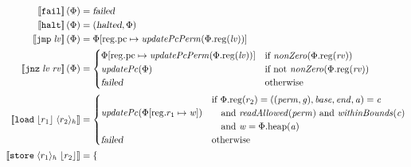 \documentclass{article}
\newcommand{\update}[2]{[#1 \mapsto #2]}
\newcommand{\sem}[1]{\left\llbracket #1 \right\rrbracket}
\newcommand{\var}[1]{\mathit{#1}}
\newcommand{\rv}{\var{rv}}
\newcommand{\lv}{\var{lv}}
\newcommand{\gl}{\var{g}}
\newcommand{\pcreg}{\mathrm{pc}}
\newcommand{\addr}{\var{a}}
\newcommand{\start}{\var{base}}
\newcommand{\addrend}{\var{end}}
\newcommand{\perm}{\var{perm}}
\newcommand{\stdcap}[1][(\perm,\gl)]{\left(#1,\start,\addrend,\addr \right)}
\newcommand{\plainproj}[1]{\mathrm{#1}}
\newcommand{\memheap}[1][\Phi]{#1.\plainproj{heap}}
\newcommand{\memreg}[1][\Phi]{#1.\plainproj{reg}}
\newcommand{\updateReg}[3][\Phi]{#1\update{\plainproj{reg}.#2}{#3}}
\newcommand{\failed}{\textsl{failed}}
\newcommand{\halted}{\textsl{halted}}
\newcommand{\plainfun}[2]{
  \ifthenelse{\equal{#2}{}}
             {\mathit{#1}}
             {\mathit{#1}(#2)}
}
\newcommand{\updatePcPerm}[1]{\plainfun{updatePcPerm}{#1}}
\newcommand{\nonZero}[1]{\plainfun{nonZero}{#1}}
\newcommand{\readAllowed}[1]{\plainfun{readAllowed}{#1}}
\newcommand{\withinBounds}[1]{\plainfun{withinBounds}{#1}}
\newcommand{\stdUpdatePc}[1]{\plainfun{updatePc}{#1}}
\newcommand{\refreg}[1]{\lfloor #1 \rfloor}
\newcommand{\refheap}[1]{\langle #1 \rangle_h}
\newcommand{\zinstr}[1]{\mathtt{#1}}
\newcommand{\fail}{\zinstr{fail}}
\newcommand{\halt}{\zinstr{halt}}
\newcommand{\oneinstr}[2]{\zinstr{#1} \; #2}
\newcommand{\jmp}[1]{\oneinstr{jmp}{#1}}
\newcommand{\twoinstr}[3]{\zinstr{#1} \; #2 \; #3}
\newcommand{\jnz}[2]{\twoinstr{jnz}{#1}{#2}}
\newcommand{\store}[2]{\twoinstr{store}{#1}{#2}}
\newcommand{\load}[2]{\twoinstr{load}{#1}{#2}}
\begin{document}
\begin{align*}
  \sem{\fail}(\Phi)                        & = \failed \\
  \sem{\halt}(\Phi)                        & = (\halted,\Phi) \\
  \sem{\jmp{\lv}}(\Phi)                    & = \updateReg{\pcreg}{\updatePcPerm{\memreg(\lv)}} \\
  \sem{\jnz{\lv}{\rv}}(\Phi)               & = 
                                             \begin{cases}
                                               \updateReg{\pcreg}{\updatePcPerm{\memreg(\lv)}} &
                                               \arraycolsep=0pt
                                               \begin{array}{l}
                                                 \text{if $\nonZero{\memreg(\rv)}$} 
                                               \end{array}\\
                                               \stdUpdatePc{\Phi} & \text{if not $\nonZero{\memreg(\rv)}$}\\
                                               \failed & \text{otherwise }
                                             \end{cases} \\
 \sem{\load{\refreg{r_1}}{\refheap{r_2}}}  & = 
                                             \begin{cases}
                                               \stdUpdatePc{\updateReg{r_1}{\var{w}}} &
                                               \arraycolsep=0pt
                                               \begin{array}{l}
                                                 \text{if }\memreg(r_2) = \stdcap = \var{c} \\
                                                 \quad\text{and }\readAllowed{\perm} \text{ and } \withinBounds{\var{c}} \\
                                                 \quad\text{and }\var{w} = \memheap(\addr)
                                               \end{array}\\
                                               \failed & \text{otherwise }
                                             \end{cases}\\
 \sem{\store{\refheap{r_1}}{\refreg{r_2}}} & = 
                                             \begin{cases}

\end{cases}
\end{align*}
\end{document}
